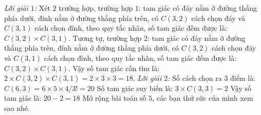 \begin{multicols}{2}
	\vskip 0.1cm
	\textit{Lời giải $1$:}
	\vskip 0.1cm
	Xét $2$ trường hợp, trường hợp $1$: tam giác có đáy nằm ở đường thẳng phía dưới, đỉnh nằm ở đường thẳng phía trên, có $C(3,2)$ cách chọn đáy và $C(3,1)$ cách chọn đỉnh, theo quy tắc nhân, số tam giác đếm được là: $C(3,2)\times C(3,1)$. Tương tự, trường hợp $2$: tam giác có đáy nằm ở đường thẳng phía trên, đỉnh nằm ở đường thẳng phía dưới, có $C(3,2)$ cách chọn đáy và $C(3,1)$ cách chọn đỉnh, theo quy tắc nhân, số tam giác đếm được là: $C(3,2)\times C(3,1)$.
	\vskip 0.1cm
	Vậy số tam giác cần tìm là: $2\times C(3,2)\times C(3,1) = 2\times3\times3=18$.
	\vskip 0.1cm
	\textit{Lời giải $2$:}
	\vskip 0.1cm
	Số cách chọn ra $3$ điểm là: $C(6,3)=6\times 5\times4/3!=20$
	\vskip 0.1cm
	Số tam giác suy biến là: $3\times C(3,3)=2$
	\vskip 0.1cm
	Vậy số tam giác là: $20-2=18$
	\vskip 0.1cm
	Mở rộng bài toán số $5$, các bạn thử sức của mình xem sao nhé.
	

\end{multicols}
